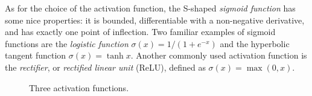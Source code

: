 \documentclass[a4paper,11pt,titlepage]{article}
\theoremstyle{definition}
\theoremstyle{plain}
\theoremstyle{remark}
\begin{document}
As for the choice of the activation function, the S-shaped \textit{sigmoid function} has some nice properties: it is bounded, differentiable with a non-negative derivative, and has exactly one point of inflection. \cite{HanMoraga} Two familiar examples of sigmoid functions are the \textit{logistic function} $\sigma(x)=1/\left(1+e^{-x}\right)$ and the hyperbolic tangent function $\sigma(x)=\tanh x$. Another commonly used activation function is the \textit{rectifier}, or \textit{rectified linear unit} (ReLU), defined as $\sigma(x)=\max(0, x)$.

\begin{figure}[htbp]
    \centering
    \begin{minipage}{0.32\textwidth}
        \centering
    \end{minipage}
    \hfill
    \begin{minipage}{0.32\textwidth}
        \centering
    \end{minipage}
    \hfill
    \begin{minipage}{0.32\textwidth}
        \centering
    \end{minipage}
    \centering
    \caption{Three activation functions.}
\end{figure}
\end{document}
